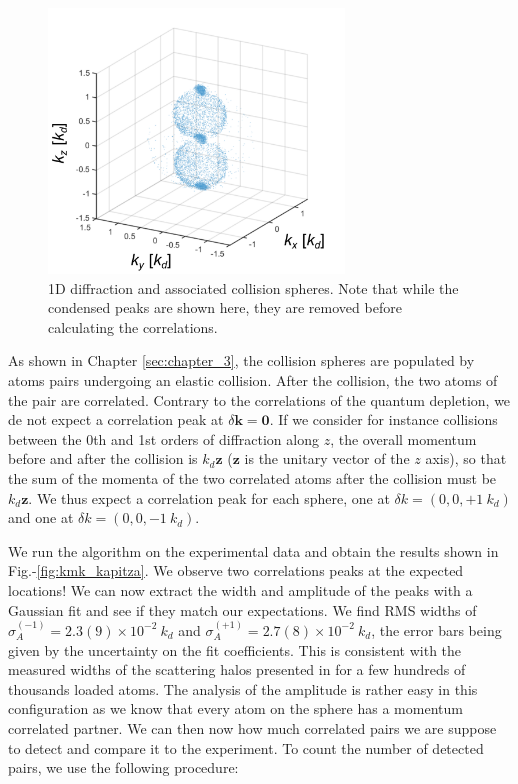 \begin{figure}
    \centering
    \includegraphics[width=0.7\textwidth]{Fig/Chapter4/1d_spheres.png}
    \caption{1D diffraction and associated collision spheres. Note that while the condensed peaks are shown here, they are removed before calculating the correlations.}
    \label{fig:1D_spheres}
\end{figure}

As shown in Chapter \ref{sec:chapter_3}, the collision spheres are populated by atoms pairs undergoing an elastic collision. After the collision, the two atoms of the pair are \kmk correlated. Contrary to the \kmk correlations of the quantum depletion, we de not expect a correlation peak at $\delta \bm{k}=\bm{0}$. If we consider for instance collisions between the 0th and 1st orders of diffraction along $z$, the overall momentum before and after the collision is $k_d \bm{z}$ ($\bm{z}$ is the unitary vector of the $z$ axis), so that the sum of the momenta of the two correlated atoms after the collision must be $k_d \bm{z}$. We thus expect a correlation peak for each sphere, one at $\delta k = (0,0,+1 \ k_d)$  and one at $\delta k = (0,0,-1 \ k_d)$.

We run the algorithm on the experimental data and obtain the results shown in Fig.-\ref{fig:kmk_kapitza}. We observe two correlations peaks at the expected locations! We can now extract the width and amplitude of the peaks with a Gaussian fit and see if they match our expectations. We find RMS widths of $\sigma_A^{(-1)}=2.3(9) \times 10^{-2} \ k_d$ and $\sigma_A^{(+1)}=2.7(8) \times 10^{-2} \ k_d$, the error bars being given by the uncertainty on the fit coefficients. This is consistent with the measured widths of the scattering halos presented in  for a few hundreds of thousands loaded atoms. 
The analysis of the amplitude is rather easy in this configuration as we know that every atom on the sphere has a momentum correlated partner. We can then now how much correlated pairs we are suppose to detect and compare it to the experiment. To count the number of detected pairs, we use the following procedure:


